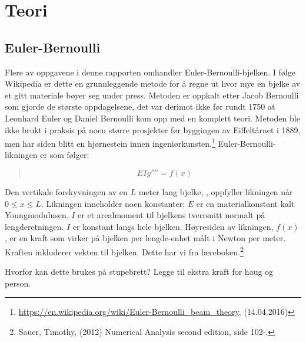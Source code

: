 \section{Teori}

\subsection{Euler-Bernoulli}
Flere av oppgavene i denne rapporten omhandler Euler-Bernoulli-bjelken. I følge Wikipedia er dette en grunnleggende metode for å regne ut hvor mye en bjelke av et gitt materiale bøyer seg under press. Metoden er oppkalt etter Jacob Bernoulli som gjorde de største oppdagelsene, det var derimot ikke før rundt 1750 at Leonhard Euler og Daniel Bernoulli kom opp med en komplett teori. Metoden ble ikke brukt i praksis på noen større prosjekter før byggingen av Eiffeltårnet i 1889, men har siden blitt en hjørnestein innen ingeniørkunsten.\footnote{\url{https://en.wikipedia.org/wiki/Euler-Bernoulli_beam_theory}, (14.04.2016)} Euler-Bernoulli-likningen er som følger:
\begin{quote}
\begin{equation}
EIy''''=f(x)
\end{equation}
\end{quote}
Den vertikale forskyvningen av en $L$ meter lang bjelke, , oppfyller likningen når $0\leq x\leq L$. Likningen inneholder noen konstanter; $E$ er en materialkonstant kalt Youngmodulusen. $I$ er et arealmoment til bjelkens tverrsnitt normalt på lengderetningen. $I$ er konstant langs hele bjelken. Høyresiden av likningen, $f(x)$, er en kraft som virker på bjelken per lengde-enhet målt i Newton per meter. Kraften inkluderer vekten til bjelken. Dette har vi fra læreboken.\footnote{Sauer, Timothy, (2012) Numerical Analysis second edition, side 102-.}

Hvorfor kan dette brukes på stupebrett?
Legge til ekstra kraft for haug og person.

